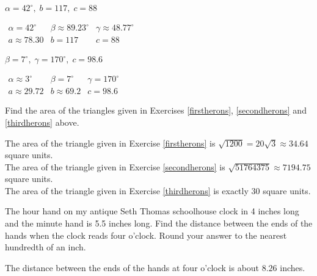 \documentclass{ximera}
\begin{document}
\begin{question}
\begin{problem}
$\alpha = 42^{\circ}, \; b = 117, \; c = 88$

\begin{solution}
$\begin{array}{lll}
\alpha = 42^{\circ} & \beta \approx 89.23^{\circ} & \gamma \approx 48.77^{\circ} \\
a \approx 78.30 & b = 117 & c = 88 \end{array}$
\end{solution}
\end{problem}

\begin{problem} \label{anylawlast}
$\beta = 7^{\circ}, \; \gamma = 170^{\circ}, \; c = 98.6$

\begin{solution}
$\begin{array}{lll}
\alpha \approx 3^{\circ} & \beta = 7^{\circ} & \gamma = 170^{\circ} \\
a \approx 29.72 & b \approx 69.2 & c = 98.6 \end{array}$
\end{solution}
\end{problem}

\end{question}

\begin{problem}
Find the area of the triangles given in Exercises \ref{firstherons}, \ref{secondherons} and \ref{thirdherons} above.

\begin{solution}
The area of the triangle given in Exercise \ref{firstherons} is $\sqrt{1200} = 20\sqrt{3} \approx 34.64$ square units.\\
The area of the triangle given in Exercise \ref{secondherons} is $\sqrt{51764375} \approx 7194.75$ square units.\\
The area of the triangle given in Exercise \ref{thirdherons} is exactly $30$ square units.
\end{solution}
\end{problem}

\begin{problem}
The hour hand on my antique Seth Thomas schoolhouse clock in 4 inches long and the minute hand is 5.5 inches long.  Find the distance between the ends of the hands when the clock reads four o'clock.  Round your answer to the nearest hundredth of an inch.

\begin{solution}
The distance between the ends of the hands at four o'clock is about $8.26$ inches.
\end{solution}
\end{problem}
\end{document}
